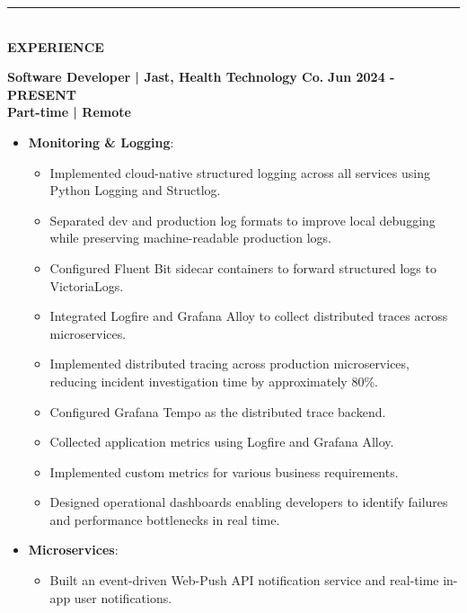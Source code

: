 \documentclass[10pt, dvipsnames, svgnames, x11names]{article}
\begin{document}
\noindent\textcolor{DarkBlue}{\rule{\textwidth}{0.05mm}} \vspace{-1mm} \\
{\LARGE \textbf{EXPERIENCE}}

\noindent \textbf{Software Developer | Jast, Health Technology Co.} \hfill \textbf{Jun 2024 - PRESENT} \\
\noindent \textbf{Part-time | Remote}

\begin{itemize}[nosep]
\item \textbf{Monitoring \& Logging}:
\begin{itemize}[nosep]
\item
Implemented cloud-native structured logging across all services using Python Logging and Structlog.

\item
Separated dev and production log formats to improve local debugging while preserving machine-readable production logs.

\item
Configured Fluent Bit sidecar containers to forward structured logs to VictoriaLogs.

\item 
Integrated Logfire and Grafana Alloy to collect distributed traces across microservices.

\item 
Implemented distributed tracing across production microservices, reducing incident investigation time by approximately 80\%.

\item 
Configured Grafana Tempo as the distributed trace backend.

\item 
Collected application metrics using Logfire and Grafana Alloy.

\item 
Implemented custom metrics for various business requirements.

\item 
Designed operational dashboards enabling developers to identify failures and performance bottlenecks in real time.
\end{itemize}

\item \textbf{Microservices}:
\begin{itemize}[nosep]
\item 
Built an event-driven Web-Push API notification service and real-time in-app user notifications.


\end{itemize}
\end{itemize}
\end{document}
